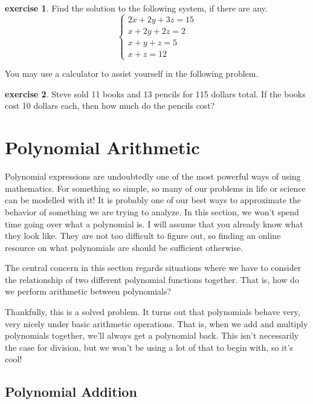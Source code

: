 \documentclass{scrbook}
\theoremstyle{definition}
\newtheorem{exercise}{exercise}[subsection]
\begin{document}
\begin{exercise} Find the solution to the following system, if there are any.
  \[
    \begin{cases}
      2x + 2y + 3z = 15\\
      x + 2y + 2z = 2\\
      x + y + z = 5\\
      x + z = 12
    \end{cases}  
  \]
\end{exercise}

You may use a calculator to assist yourself in the following problem.

\begin{exercise}
  Steve sold 11 books and 13 pencils for 115 dollars total. If the books cost 10 dollars each, then how much do the pencils cost?
\end{exercise}

\section{Polynomial Arithmetic}

Polynomial expressions are undoubtedly one of the most powerful ways of using mathematics. For something so simple, so many of our problems in life or science can be modelled with it! It is probably one of our best ways to approximate the behavior of something we are trying to analyze. In this section, we won't spend time going over what a polynomial is. I will assume that you already know what they look like. They are not too difficult to figure out, so finding an online resource on what polynomials are should be sufficient otherwise. 

The central concern in this section regards situations where we have to consider the relationship of two different polynomial functions together. That is, how do we perform arithmetic between polynomials?

Thankfully, this is a solved problem. It turns out that polynomials behave very, very nicely under basic arithmetic operations. That is, when we add and multiply polynomials together, we'll always get a polynomial back. This isn't necessarily the case for division, but we won't be using a lot of that to begin with, so it's cool!

\subsection{Polynomial Addition}
\end{document}
